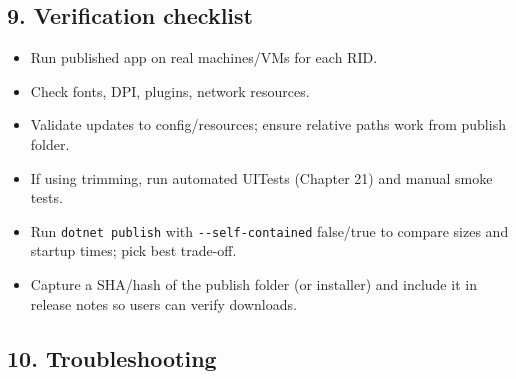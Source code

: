 \subsection{9. Verification checklist}\label{verification-checklist}

\begin{itemize}
\tightlist
\item
  Run published app on real machines/VMs for each RID.
\item
  Check fonts, DPI, plugins, network resources.
\item
  Validate updates to config/resources; ensure relative paths work from
  publish folder.
\item
  If using trimming, run automated UITests (Chapter 21) and manual smoke
  tests.
\item
  Run \passthrough{\lstinline!dotnet publish!} with
  \passthrough{\lstinline!--self-contained!} false/true to compare sizes
  and startup times; pick best trade-off.
\item
  Capture a SHA/hash of the publish folder (or installer) and include it
  in release notes so users can verify downloads.
\end{itemize}

\subsection{10. Troubleshooting}\label{troubleshooting-3}

